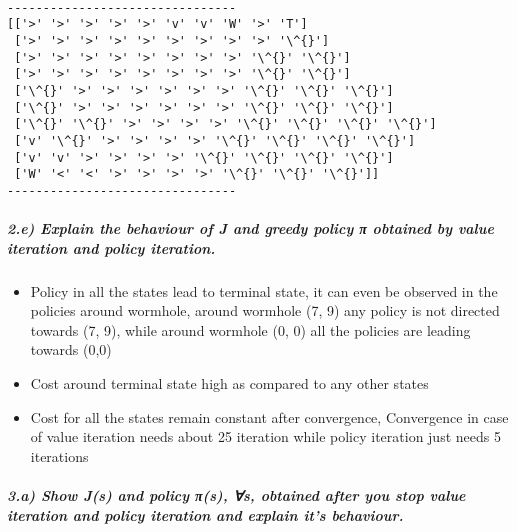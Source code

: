 \documentclass[11pt]{article}
\providecommand{\tightlist}{%
      \setlength{\itemsep}{0pt}\setlength{\parskip}{0pt}}
\begin{document}
    \begin{center}
    \end{center}
    { \hspace*{\fill} \\}
    
    \begin{Verbatim}[commandchars=\\\{\}]
--------------------------------
[['>' '>' '>' '>' '>' 'v' 'v' 'W' '>' 'T']
 ['>' '>' '>' '>' '>' '>' '>' '>' '>' '\^{}']
 ['>' '>' '>' '>' '>' '>' '>' '>' '\^{}' '\^{}']
 ['>' '>' '>' '>' '>' '>' '>' '>' '\^{}' '\^{}']
 ['\^{}' '>' '>' '>' '>' '>' '>' '\^{}' '\^{}' '\^{}']
 ['\^{}' '>' '>' '>' '>' '>' '>' '\^{}' '\^{}' '\^{}']
 ['\^{}' '\^{}' '>' '>' '>' '>' '\^{}' '\^{}' '\^{}' '\^{}']
 ['v' '\^{}' '>' '>' '>' '>' '\^{}' '\^{}' '\^{}' '\^{}']
 ['v' 'v' '>' '>' '>' '>' '\^{}' '\^{}' '\^{}' '\^{}']
 ['W' '<' '<' '>' '>' '>' '>' '\^{}' '\^{}' '\^{}']]
--------------------------------

    \end{Verbatim}

    \subparagraph{2.e) Explain the behaviour of J and greedy policy π
obtained by value iteration and policy
iteration.}\label{e-explain-the-behaviour-of-j-and-greedy-policy-ux3c0-obtained-by-value-iteration-and-policy-iteration.}

\begin{itemize}
\tightlist
\item
  Policy in all the states lead to terminal state, it can even be
  observed in the policies around wormhole, around wormhole (7, 9) any
  policy is not directed towards (7, 9), while around wormhole (0, 0)
  all the policies are leading towards (0,0)\\
\item
  Cost around terminal state high as compared to any other states
\item
  Cost for all the states remain constant after convergence, Convergence
  in case of value iteration needs about 25 iteration while policy
  iteration just needs 5 iterations
\end{itemize}

    \subparagraph{3.a) Show J(s) and policy π(s), ∀s, obtained after you
stop value iteration and policy iteration and explain it's
behaviour.}\label{a-show-js-and-policy-ux3c0s-s-obtained-after-you-stop-value-iteration-and-policy-iteration-and-explain-its-behaviour.}
\end{document}
